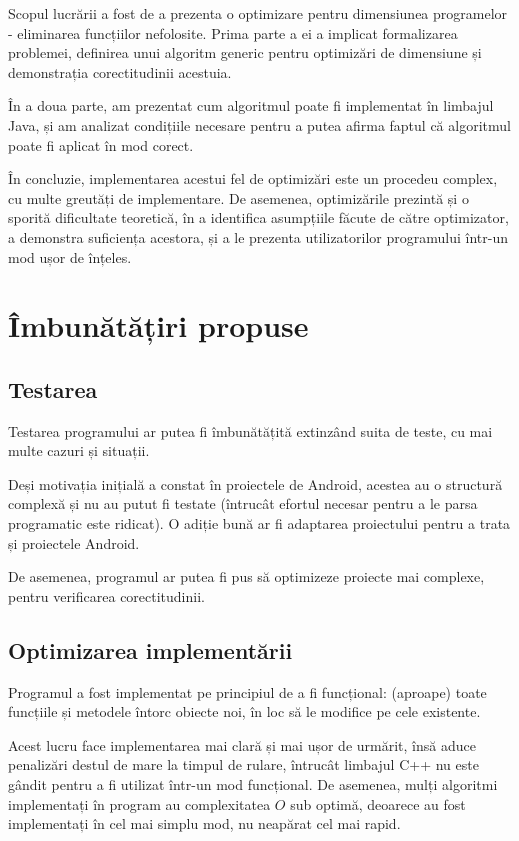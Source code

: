 Scopul lucrării a fost de a prezenta o optimizare pentru dimensiunea
programelor - eliminarea funcțiilor nefolosite.
Prima parte a ei a implicat formalizarea problemei, definirea unui algoritm
generic pentru optimizări de dimensiune și demonstrația
corectitudinii acestuia.

În a doua parte, am prezentat cum algoritmul poate fi implementat în limbajul
Java, și am analizat condițiile necesare pentru a putea afirma faptul că
algoritmul poate fi aplicat în mod corect.

În concluzie, implementarea acestui fel de optimizări este un procedeu complex,
cu multe greutăți de implementare.
De asemenea, optimizările prezintă și o sporită dificultate teoretică, în a
identifica asumpțiile făcute de către optimizator, a demonstra suficiența
acestora, și a le prezenta utilizatorilor programului într-un mod ușor de
înțeles.

\section{Îmbunătățiri propuse}

\subsection{Testarea}
Testarea programului ar putea fi îmbunătățită extinzând suita de teste, cu mai
multe cazuri și situații.

Deși motivația inițială a constat în proiectele de Android, acestea au o
structură complexă și nu au putut fi testate (întrucât efortul necesar
pentru a le parsa programatic este ridicat). O adiție bună ar fi adaptarea
proiectului pentru a trata și proiectele Android.

De asemenea, programul ar putea fi pus să optimizeze proiecte mai complexe,
pentru verificarea corectitudinii.


\subsection{Optimizarea implementării}
Programul a fost implementat pe principiul de a fi funcțional: (aproape) toate
funcțiile și metodele întorc obiecte noi, în loc să le modifice pe cele
existente.

Acest lucru face implementarea mai clară și mai ușor de urmărit, însă aduce
penalizări destul de mare la timpul de rulare, întrucât limbajul C++ nu este
gândit pentru a fi utilizat într-un mod funcțional.
De asemenea, mulți algoritmi implementați în program au complexitatea $O$
sub optimă, deoarece au fost implementați în cel mai simplu mod, nu neapărat cel
mai rapid.
